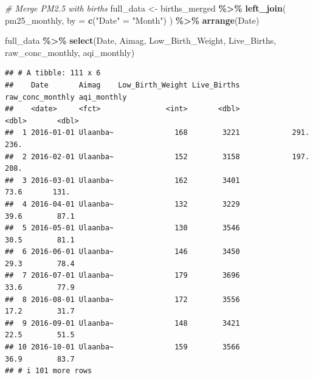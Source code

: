 \documentclass[
]{article}
\newenvironment{Shaded}{\begin{snugshade}}{\end{snugshade}}
\newcommand{\AttributeTok}[1]{\textcolor[rgb]{0.13,0.29,0.53}{#1}}
\newcommand{\CommentTok}[1]{\textcolor[rgb]{0.56,0.35,0.01}{\textit{#1}}}
\newcommand{\FunctionTok}[1]{\textcolor[rgb]{0.13,0.29,0.53}{\textbf{#1}}}
\newcommand{\NormalTok}[1]{#1}
\newcommand{\OtherTok}[1]{\textcolor[rgb]{0.56,0.35,0.01}{#1}}
\newcommand{\SpecialCharTok}[1]{\textcolor[rgb]{0.81,0.36,0.00}{\textbf{#1}}}
\newcommand{\StringTok}[1]{\textcolor[rgb]{0.31,0.60,0.02}{#1}}
\begin{document}
\begin{Shaded}
\begin{Highlighting}[]
\CommentTok{\# Merge PM2.5 with births}
\NormalTok{full\_data }\OtherTok{\textless{}{-}}\NormalTok{ births\_merged }\SpecialCharTok{\%\textgreater{}\%}
  \FunctionTok{left\_join}\NormalTok{(}
\NormalTok{    pm25\_monthly,}
    \AttributeTok{by =} \FunctionTok{c}\NormalTok{(}\StringTok{"Date"} \OtherTok{=} \StringTok{"Month"}\NormalTok{)}
\NormalTok{  ) }\SpecialCharTok{\%\textgreater{}\%}
  \FunctionTok{arrange}\NormalTok{(Date)}


\NormalTok{full\_data }\SpecialCharTok{\%\textgreater{}\%} 
  \FunctionTok{select}\NormalTok{(Date, Aimag, Low\_Birth\_Weight, Live\_Births, raw\_conc\_monthly, aqi\_monthly)}
\end{Highlighting}
\end{Shaded}

\begin{verbatim}
## # A tibble: 111 x 6
##    Date       Aimag    Low_Birth_Weight Live_Births raw_conc_monthly aqi_monthly
##    <date>     <fct>               <int>       <dbl>            <dbl>       <dbl>
##  1 2016-01-01 Ulaanba~              168        3221            291.        236. 
##  2 2016-02-01 Ulaanba~              152        3158            197.        208. 
##  3 2016-03-01 Ulaanba~              162        3401             73.6       131. 
##  4 2016-04-01 Ulaanba~              132        3229             39.6        87.1
##  5 2016-05-01 Ulaanba~              130        3546             30.5        81.1
##  6 2016-06-01 Ulaanba~              146        3450             29.3        78.4
##  7 2016-07-01 Ulaanba~              179        3696             33.6        77.9
##  8 2016-08-01 Ulaanba~              172        3556             17.2        31.7
##  9 2016-09-01 Ulaanba~              148        3421             22.5        51.5
## 10 2016-10-01 Ulaanba~              159        3566             36.9        83.7
## # i 101 more rows
\end{verbatim}
\end{document}
